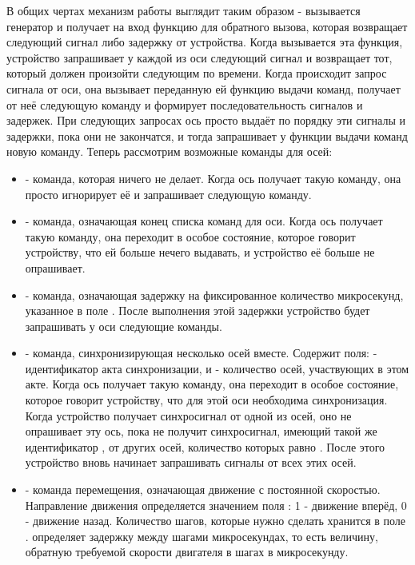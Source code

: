 \documentclass[14pt,russian,a4paper]{extarticle}
\newcommand{\gb}[1]{\guillemotleft #1\guillemotright}
\begin{document}
В общих чертах механизм работы выглядит таким образом - вызывается генератор и получает на вход функцию для обратного вызова, которая возвращает следующий сигнал либо задержку от устройства. Когда вызывается эта функция, устройство запрашивает у каждой из оси следующий сигнал и возвращает тот, который должен произойти следующим по времени. Когда происходит запрос сигнала от оси, она вызывает переданную ей функцию выдачи команд, получает от неё следующую команду и формирует последовательность сигналов и задержек. При следующих запросах ось просто выдаёт по порядку эти сигналы и задержки, пока они не закончатся, и тогда запрашивает у функции выдачи команд новую команду.
Теперь рассмотрим возможные команды для осей:
\begin{itemize}
    \item {} - команда, которая ничего не делает. Когда ось получает такую команду, она просто игнорирует её и запрашивает следующую команду.
    \item {} - команда, означающая конец списка команд для оси. Когда ось получает такую команду, она переходит в особое состояние, которое говорит устройству, что ей больше нечего выдавать, и устройство её больше не опрашивает.
    \item {} - команда, означающая задержку на фиксированное количество микросекунд, указанное в поле \gb{}. После выполнения этой задержки устройство будет запрашивать у оси следующие команды.
    \item {} - команда, синхронизирующая несколько осей вместе. Содержит поля: \gb{} - идентификатор акта синхронизации, и \gb{} - количество осей, участвующих в этом акте. Когда ось получает такую команду, она переходит в особое состояние, которое говорит устройству, что для этой оси необходима синхронизация. Когда устройство получает синхросигнал от одной из осей, оно не опрашивает эту ось, пока не получит синхросигнал, имеющий такой же идентификатор \gb{}, от других осей, количество которых равно \gb{}. После этого устройство вновь начинает запрашивать сигналы от всех этих осей.
    \item {} - команда перемещения, означающая движение с постоянной скоростью. Направление движения определяется значением поля \gb{}: 1 - движение вперёд, 0 - движение назад. Количество шагов, которые нужно сделать хранится в поле \gb{}. \gb{} определяет задержку между шагами микросекундах, то есть величину, обратную требуемой скорости двигателя в шагах в микросекунду.

\end{itemize}
\end{document}
